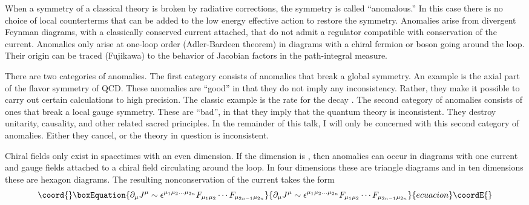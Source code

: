 \documentclass[a4paper,12pt]{article}
\begin{document}
When a symmetry of a classical theory is broken by radiative corrections,
the symmetry is called ``anomalous.'' In this case there is no
choice of local counterterms that can be added to the low energy
effective action to restore the symmetry. Anomalies arise from
divergent Feynman diagrams, with a classically conserved current
attached, that do not admit a regulator compatible with
conservation of the current. Anomalies only arise at one-loop
order (Adler-Bardeen theorem) in diagrams with a chiral fermion or
boson going around the loop. Their origin can be traced (Fujikawa)
to the behavior of Jacobian factors in the path-integral measure.

There are two categories of anomalies. The first category consists
of anomalies that break a global symmetry. An example is the axial
part of the flavor \coordHE{} symmetry of QCD.  These
anomalies are ``good'' in that they do not imply any
inconsistency. Rather, they make it possible to carry out certain
calculations to high precision. The classic example is the rate for
the decay \myHighlight{$\pi^0 \to \gamma\gamma$}\coordHE{}. The second category of
anomalies consists of ones that break a local gauge symmetry.
These are ``bad'', in that they imply that the quantum theory is
inconsistent. They destroy unitarity, causality, and other related
sacred principles. In the remainder of this talk, I will only be
concerned with this second category of anomalies. Either they
cancel, or the theory in question is inconsistent.

Chiral fields only exist in spacetimes with an even dimension. If
the dimension is \coordHE{}, then anomalies can occur in diagrams
with one current and \coordHE{} gauge fields attached to a chiral field
circulating around the loop. In four dimensions these are triangle
diagrams and in ten dimensions these are hexagon diagrams. The
resulting nonconservation of the current \coordHE{} takes the form
\begin{equation}\coord{}\boxEquation{
\partial_{\mu} J^{\mu} \sim \epsilon^{\mu_1 \mu_2 \ldots \mu_{2n}}
F_{\mu_1 \mu_2}  \cdots
F_{\mu_{2n-1} \mu_{2n}}
}{
\partial_{\mu} J^{\mu} \sim \epsilon^{\mu_1 \mu_2 \ldots \mu_{2n}}
F_{\mu_1 \mu_2}  \cdots
F_{\mu_{2n-1} \mu_{2n}}
}{ecuacion}\coordE{}\end{equation}
\end{document}
